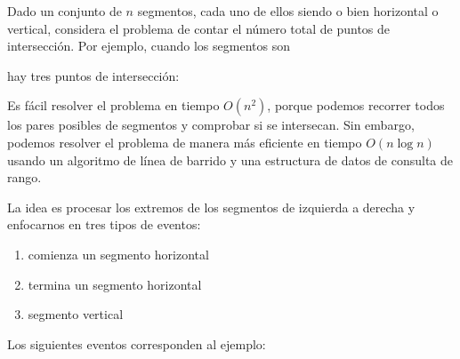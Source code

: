 Dado un conjunto de $n$ segmentos, cada uno de ellos siendo o bien
horizontal o vertical, considera el problema de
contar el número total de puntos de intersección.
Por ejemplo, cuando los segmentos son
\begin{center}
\end{center}
hay tres puntos de intersección:
\begin{center}
\end{center}

Es fácil resolver el problema en tiempo $O(n^2)$,
porque podemos recorrer todos los pares posibles de segmentos
y comprobar si se intersecan.
Sin embargo, podemos resolver el problema de manera más eficiente
en tiempo $O(n \log n)$ usando un algoritmo de línea de barrido
y una estructura de datos de consulta de rango.

La idea es procesar los extremos de los
segmentos de izquierda a derecha y
enfocarnos en tres tipos de eventos:
\begin{enumerate}[noitemsep]
\item[(1)] comienza un segmento horizontal
\item[(2)] termina un segmento horizontal
\item[(3)] segmento vertical
\end{enumerate}

Los siguientes eventos corresponden al ejemplo:
\begin{center}
\end{center}

